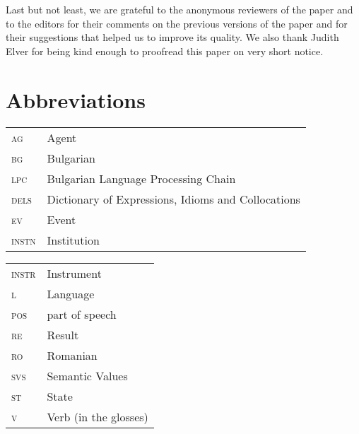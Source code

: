 \documentclass[output=paper]{langsci/langscibook}
\begin{document}
Last but not least, we are grateful to the anonymous reviewers of the
paper and to the editors for their comments on the previous versions of
the paper and for their suggestions that helped us to improve its
quality. We also thank Judith Elver for being kind enough to proofread
this paper on very short notice.


\section*{Abbreviations} 
\begin{tabularx}{.5\textwidth}{>{\scshape}lQ}
{a}g & Agent\\
{bg} & Bulgarian \\
{lpc} & Bulgarian Language Processing Chain  \\
{dels} & Dictionary of Expressions, Idioms and Collocations \\
{e}v & Event\\
{i}nstn & Institution\\
\end{tabularx}
\begin{tabularx}{.4\textwidth}{>{\scshape}lQ}
{i}nstr & Instrument \\
{l} & Language\\
{p}o{s} & part of speech \\
{r}e & Result\\
{ro} & Romanian  \\
{sv}s & Semantic Values \\
{s}t & State\\
{v} & Verb (in the glosses)  \\
\end{tabularx} 

\sloppy


\printbibliography[heading=subbibliography,notkeyword=this]

 
\end{document}
